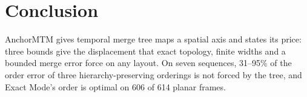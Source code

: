 \documentclass[review]{vgtc}
\begin{document}
\section{Conclusion}
AnchorMTM gives temporal merge tree maps a spatial axis and states its price: three bounds give the displacement that exact topology, finite widths and a bounded merge error force on any layout. On seven sequences, 31--95\% of the order error of three hierarchy-preserving orderings is not forced by the tree, and Exact Mode's order is optimal on 606 of 614 planar frames.

\begingroup
{}


\endgroup
\end{document}
